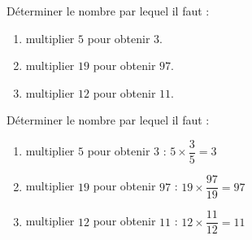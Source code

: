 \begin{exercice*}        
    Déterminer le nombre par lequel il faut :
    \begin{enumerate}
       \item multiplier $5$ pour obtenir $3$.
       \item multiplier $19$ pour obtenir $97$.
       \item multiplier $12$ pour obtenir $11$.
    \end{enumerate}
\end{exercice*}
\begin{corrige}
    Déterminer le nombre par lequel il faut :

    \begin{enumerate}
        \item multiplier $5$ pour obtenir $3$ : {\red $5\times \dfrac{3}{5}=3$}
        \item multiplier $19$ pour obtenir $97$ : {\red $19\times \dfrac{97}{19}=97$}
        
        \smallskip
        \item multiplier $12$ pour obtenir $11$ : {\red $12\times \dfrac{11}{12}=11$}
    \end{enumerate}
\end{corrige}
    
    